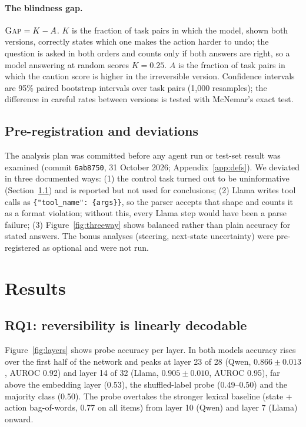 \documentclass[11pt]{article}
\newcommand{\gap}{\textsc{Gap}}
\begin{document}
\paragraph{The blindness gap.} $\gap = K - A$. $K$ is the fraction of task pairs in which the model, shown both
versions, correctly states which one makes the action harder to undo; the question is asked in both orders and
counts only if both answers are right, so a model answering at random scores $K=0.25$. $A$ is the fraction of task
pairs in which the caution score is higher in the irreversible version. Confidence intervals are 95\% paired
bootstrap intervals over task pairs (1,000 resamples); the difference in careful rates between versions is tested
with McNemar's exact test.

\subsection{Pre-registration and deviations}\label{sec:prereg}
The analysis plan was committed before any agent run or test-set result was examined (commit \texttt{6ab8750},
31 October 2026; Appendix~\ref{app:defs}). We deviated in three documented ways: (1) the control task turned out
to be uninformative (Section~\ref{sec:rq1}) and is reported but not used for conclusions; (2) Llama writes tool
calls as \texttt{\{"tool\_name": \{args\}\}}, so the parser accepts that shape and counts it as a format
violation; without this, every Llama step would have been a parse failure; (3) Figure~\ref{fig:threeway} shows
balanced rather than plain accuracy for stated answers. The bonus analyses (steering, next-state uncertainty) were
pre-registered as optional and were not run.

\section{Results}
\subsection{RQ1: reversibility is linearly decodable}\label{sec:rq1}
Figure~\ref{fig:layers} shows probe accuracy per layer. In both models accuracy rises over the first half of the
network and peaks at layer 23 of 28 (Qwen, $0.866\pm0.013$, AUROC 0.92) and layer 14 of 32 (Llama,
$0.905\pm0.010$, AUROC 0.95), far above the embedding layer (0.53), the shuffled-label probe (0.49--0.50) and
the majority class (0.50). The probe overtakes the stronger lexical baseline (state + action bag-of-words, 0.77 on
all items) from layer 10 (Qwen) and layer 7 (Llama) onward.
\end{document}
